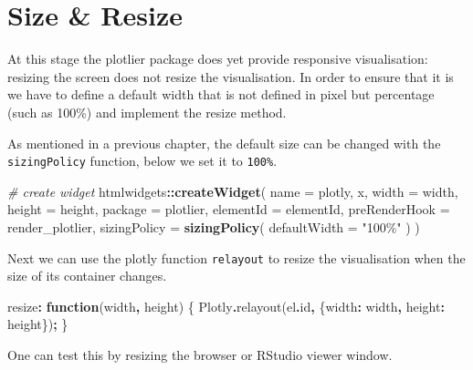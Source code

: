\documentclass[
]{krantz}
\makeatletter
\newenvironment{Shaded}{\begin{snugshade}}{\end{snugshade}}
\newcommand{\AttributeTok}[1]{\textcolor[rgb]{0.61,0.61,0.61}{#1}}
\newcommand{\CommentTok}[1]{\textcolor[rgb]{0.37,0.37,0.37}{\textit{#1}}}
\newcommand{\DataTypeTok}[1]{\textcolor[rgb]{0.27,0.27,0.27}{#1}}
\newcommand{\FunctionTok}[1]{\textcolor[rgb]{0,0,0}{#1}}
\newcommand{\KeywordTok}[1]{\textcolor[rgb]{0.27,0.27,0.27}{\textbf{#1}}}
\newcommand{\NormalTok}[1]{#1}
\newcommand{\OperatorTok}[1]{\textcolor[rgb]{0.43,0.43,0.43}{\textbf{#1}}}
\newcommand{\StringTok}[1]{\textcolor[rgb]{0.5,0.5,0.5}{#1}}
\newenvironment{kframe}{%
\medskip{}
\setlength{\fboxsep}{.8em}
 \def\at@end@of@kframe{}%
 \ifinner\ifhmode%
  \def\at@end@of@kframe{\end{minipage}}%
  \begin{minipage}{\columnwidth}%
 \fi\fi%
 \def\FrameCommand##1{\hskip\@totalleftmargin \hskip-\fboxsep
 \colorbox{shadecolor}{##1}\hskip-\fboxsep
     \hskip-\linewidth \hskip-\@totalleftmargin \hskip\columnwidth}%
 \MakeFramed {\advance\hsize-\width
   \@totalleftmargin\z@ \linewidth\hsize
   \@setminipage}}%
 {\par\unskip\endMakeFramed%
 \at@end@of@kframe}
\renewenvironment{Shaded}{\begin{kframe}}{\end{kframe}}
\makeatother
\begin{document}
\hypertarget{widgets-ex-plotly-sizing}{%
\section{Size \& Resize}\label{widgets-ex-plotly-sizing}}

At this stage the plotlier package does yet provide responsive visualisation: resizing the screen does not resize the visualisation. In order to ensure that it is we have to define a default width that is not defined in pixel but percentage (such as 100\%) and implement the resize method.

As mentioned in a previous chapter, the default size can be changed with the \texttt{sizingPolicy} function, below we set it to \texttt{100\%}.

\begin{Shaded}
\begin{Highlighting}[]
\CommentTok{\# create widget}
\NormalTok{htmlwidgets}\OperatorTok{::}\KeywordTok{createWidget}\NormalTok{(}
  \DataTypeTok{name =} \StringTok{\textquotesingle{}plotly\textquotesingle{}}\NormalTok{,}
\NormalTok{  x,}
  \DataTypeTok{width =}\NormalTok{ width,}
  \DataTypeTok{height =}\NormalTok{ height,}
  \DataTypeTok{package =} \StringTok{\textquotesingle{}plotlier\textquotesingle{}}\NormalTok{,}
  \DataTypeTok{elementId =}\NormalTok{ elementId,}
  \DataTypeTok{preRenderHook =}\NormalTok{ render\_plotlier,}
  \DataTypeTok{sizingPolicy =} \KeywordTok{sizingPolicy}\NormalTok{(}
    \DataTypeTok{defaultWidth =} \StringTok{"100\%"}
\NormalTok{  )}
\NormalTok{)}
\end{Highlighting}
\end{Shaded}

Next we can use the plotly function \texttt{relayout} to resize the visualisation when the size of its container changes.

\begin{Shaded}
\begin{Highlighting}[]
\NormalTok{resize}\OperatorTok{:} \KeywordTok{function}\NormalTok{(width}\OperatorTok{,}\NormalTok{ height) \{}
\NormalTok{  Plotly}\OperatorTok{.}\FunctionTok{relayout}\NormalTok{(el}\OperatorTok{.}\AttributeTok{id}\OperatorTok{,}\NormalTok{ \{}\DataTypeTok{width}\OperatorTok{:}\NormalTok{ width}\OperatorTok{,} \DataTypeTok{height}\OperatorTok{:}\NormalTok{ height\})}\OperatorTok{;}
\NormalTok{\}}
\end{Highlighting}
\end{Shaded}

One can test this by resizing the browser or RStudio viewer window.
\end{document}

